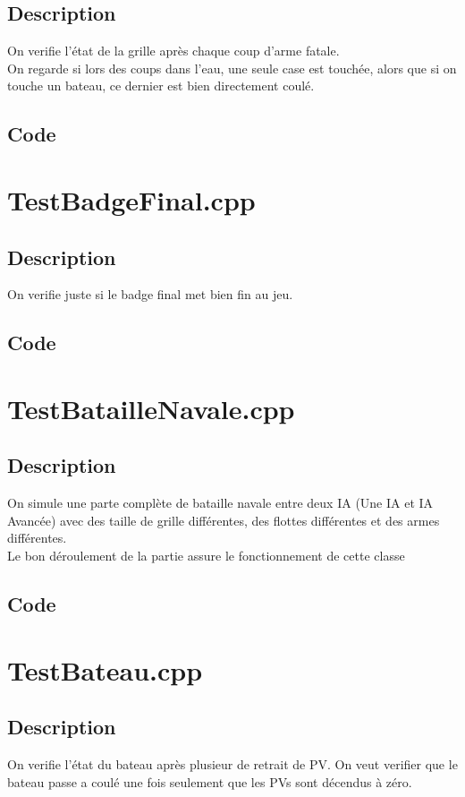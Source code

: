         \subsection{Description}
            On verifie l'état de la grille après chaque coup d'arme fatale.\\
            On regarde si lors des coups dans l'eau, une seule case est touchée, alors que si on touche un bateau, ce dernier est bien directement coulé.
        \subsection{Code}
    \section{TestBadgeFinal.cpp}
        \subsection{Description}
            On verifie juste si le badge final met bien fin au jeu.
        \subsection{Code}
    \section{TestBatailleNavale.cpp}
        \subsection{Description}
            On simule une parte complète de bataille navale entre deux IA (Une IA et IA Avancée) avec des taille de grille différentes, des flottes différentes et des armes différentes.\\
            Le bon déroulement de la partie assure le fonctionnement de cette classe
        \subsection{Code}
    \section{TestBateau.cpp}
        \subsection{Description}
            On verifie l'état du bateau après plusieur de retrait de PV. On veut verifier que le bateau passe a coulé une fois seulement que les PVs sont décendus à zéro.
